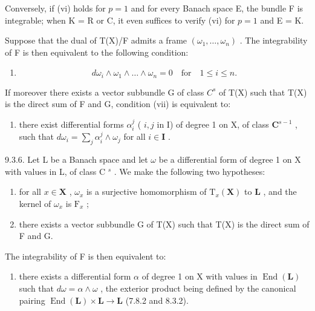 Conversely, if (vi) holds for \(p=1\) and for every Banach space E, the bundle F is integrable; when K = R or C, it even suffices to verify (vi) for \(p=1\) and E = K.

Suppose that the dual of T(X)/F admits a frame \((\omega_{1},\ldots,\omega_{n})\) . The integrability of F is then equivalent to the following condition:

\begin{enumerate}
\def\labelenumi{(\roman{enumi})}
\setcounter{enumi}{6}
\tightlist
\item
  \[
  d \omega_ {i} \wedge \omega_ {1} \wedge \dots \wedge \omega_ {n} = 0 \quad \text {for} \quad 1 \leqslant i \leqslant n.
  \]
\end{enumerate}

If moreover there exists a vector subbundle G of class \(C^{s}\) of T(X) such that T(X) is the direct sum of F and G, condition (vii) is equivalent to:

\begin{enumerate}
\def\labelenumi{(\roman{enumi})}
\setcounter{enumi}{7}
\tightlist
\item
  there exist differential forms \(\alpha_{i}^{j}\) ( \(i, j\) in I) of degree 1 on X, of class \(\mathbf{C}^{s-1}\) , such that \(d\omega_{i} = \sum_{j} \alpha_{i}^{j} \wedge \omega_{j}\) for all \(i \in \mathbf{I}\) .
\end{enumerate}

9.3.6. Let L be a Banach space and let \(\omega\) be a differential form of degree 1 on X with values in L, of class C \(^{s}\) . We make the following two hypotheses:

\begin{enumerate}
\def\labelenumi{\alph{enumi})}
\item
  for all \(x \in \mathbf{X}\) , \(\omega_x\) is a surjective homomorphism of \(\mathrm{T}_x(\mathbf{X})\) to \(\mathbf{L}\) , and the kernel of \(\omega_x\) is \(\mathrm{F}_x\) ;
\item
  there exists a vector subbundle G of T(X) such that T(X) is the direct sum of F and G.
\end{enumerate}

The integrability of F is then equivalent to:

\begin{enumerate}
\def\labelenumi{(\roman{enumi})}
\setcounter{enumi}{8}
\tightlist
\item
  there exists a differential form \(\alpha\) of degree 1 on X with values in \(\operatorname{End}(\mathbf{L})\) such that \(d\omega = \alpha \wedge \omega\) , the exterior product being defined by the canonical pairing \(\operatorname{End}(\mathbf{L}) \times \mathbf{L} \to \mathbf{L}\) (7.8.2 and 8.3.2).
\end{enumerate}


